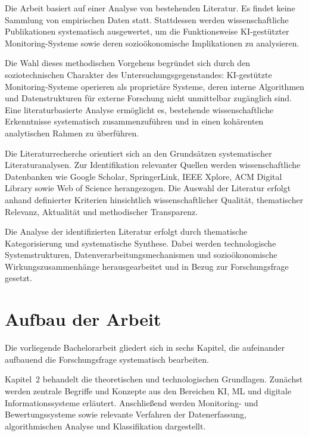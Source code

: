Die Arbeit basiert auf einer Analyse von bestehenden Literatur. Es findet keine Sammlung von empirischen Daten statt. Stattdessen werden wissenschaftliche Publikationen systematisch ausgewertet, um die Funktionsweise \ac{KI}-gestützter Monitoring-Systeme sowie deren sozioökonomische Implikationen zu analysieren.

Die Wahl dieses methodischen Vorgehens begründet sich durch den soziotechnischen Charakter des Untersuchungsgegenstandes: \ac{KI}-gestützte Monitoring-Systeme operieren als proprietäre Systeme, deren interne Algorithmen und Datenstrukturen für externe Forschung nicht unmittelbar zugänglich sind. Eine literaturbasierte Analyse ermöglicht es, bestehende wissenschaftliche Erkenntnisse systematisch zusammenzuführen und in einen kohärenten analytischen Rahmen zu überführen.

Die Literaturrecherche orientiert sich an den Grundsätzen systematischer Literaturanalysen. Zur Identifikation relevanter Quellen werden wissenschaftliche Datenbanken wie Google Scholar, SpringerLink, IEEE Xplore, ACM Digital Library sowie Web of Science herangezogen. Die Auswahl der Literatur erfolgt anhand definierter Kriterien hinsichtlich wissenschaftlicher Qualität, thematischer Relevanz, Aktualität und methodischer Transparenz.

Die Analyse der identifizierten Literatur erfolgt durch thematische Kategorisierung und systematische Synthese. Dabei werden technologische Systemstrukturen, Datenverarbeitungsmechanismen und sozioökonomische Wirkungszusammenhänge herausgearbeitet und in Bezug zur Forschungsfrage gesetzt.


\section{Aufbau der Arbeit}

Die vorliegende Bachelorarbeit gliedert sich in sechs Kapitel, die aufeinander aufbauend die Forschungsfrage systematisch bearbeiten.

Kapitel~2 behandelt die theoretischen und technologischen Grundlagen. Zunächst werden zentrale Begriffe und Konzepte aus den Bereichen \ac{KI}, \ac{ML} und digitale Informationssysteme erläutert. Anschließend werden Monitoring- und Bewertungssysteme sowie relevante Verfahren der Datenerfassung, algorithmischen Analyse und Klassifikation dargestellt.

